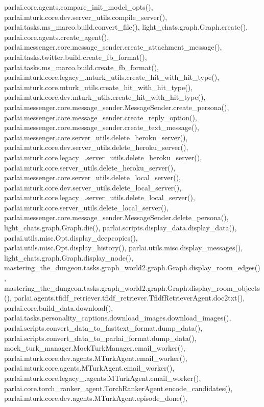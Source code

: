 parlai.\+core.\+agents.\+compare\+\_\+init\+\_\+model\+\_\+opts(), parlai.\+mturk.\+core.\+dev.\+server\+\_\+utils.\+compile\+\_\+server(), parlai.\+tasks.\+ms\+\_\+marco.\+build.\+convert\+\_\+file(), light\+\_\+chats.\+graph.\+Graph.\+create(), parlai.\+core.\+agents.\+create\+\_\+agent(), parlai.\+messenger.\+core.\+message\+\_\+sender.\+create\+\_\+attachment\+\_\+message(), parlai.\+tasks.\+twitter.\+build.\+create\+\_\+fb\+\_\+format(), parlai.\+tasks.\+ms\+\_\+marco.\+build.\+create\+\_\+fb\+\_\+format(), parlai.\+mturk.\+core.\+legacy\+\_.\+mturk\+\_\+utils.\+create\+\_\+hit\+\_\+with\+\_\+hit\+\_\+type(), parlai.\+mturk.\+core.\+mturk\+\_\+utils.\+create\+\_\+hit\+\_\+with\+\_\+hit\+\_\+type(), parlai.\+mturk.\+core.\+dev.\+mturk\+\_\+utils.\+create\+\_\+hit\+\_\+with\+\_\+hit\+\_\+type(), parlai.\+messenger.\+core.\+message\+\_\+sender.\+Message\+Sender.\+create\+\_\+persona(), parlai.\+messenger.\+core.\+message\+\_\+sender.\+create\+\_\+reply\+\_\+option(), parlai.\+messenger.\+core.\+message\+\_\+sender.\+create\+\_\+text\+\_\+message(), parlai.\+messenger.\+core.\+server\+\_\+utils.\+delete\+\_\+heroku\+\_\+server(), parlai.\+mturk.\+core.\+dev.\+server\+\_\+utils.\+delete\+\_\+heroku\+\_\+server(), parlai.\+mturk.\+core.\+legacy\+\_.\+server\+\_\+utils.\+delete\+\_\+heroku\+\_\+server(), parlai.\+mturk.\+core.\+server\+\_\+utils.\+delete\+\_\+heroku\+\_\+server(), parlai.\+messenger.\+core.\+server\+\_\+utils.\+delete\+\_\+local\+\_\+server(), parlai.\+mturk.\+core.\+dev.\+server\+\_\+utils.\+delete\+\_\+local\+\_\+server(), parlai.\+mturk.\+core.\+legacy\+\_.\+server\+\_\+utils.\+delete\+\_\+local\+\_\+server(), parlai.\+mturk.\+core.\+server\+\_\+utils.\+delete\+\_\+local\+\_\+server(), parlai.\+messenger.\+core.\+message\+\_\+sender.\+Message\+Sender.\+delete\+\_\+persona(), light\+\_\+chats.\+graph.\+Graph.\+die(), parlai.\+scripts.\+display\+\_\+data.\+display\+\_\+data(), parlai.\+utils.\+misc.\+Opt.\+display\+\_\+deepcopies(), parlai.\+utils.\+misc.\+Opt.\+display\+\_\+history(), parlai.\+utils.\+misc.\+display\+\_\+messages(), light\+\_\+chats.\+graph.\+Graph.\+display\+\_\+node(), mastering\+\_\+the\+\_\+dungeon.\+tasks.\+graph\+\_\+world2.\+graph.\+Graph.\+display\+\_\+room\+\_\+edges(), mastering\+\_\+the\+\_\+dungeon.\+tasks.\+graph\+\_\+world2.\+graph.\+Graph.\+display\+\_\+room\+\_\+objects(), parlai.\+agents.\+tfidf\+\_\+retriever.\+tfidf\+\_\+retriever.\+Tfidf\+Retriever\+Agent.\+doc2txt(), parlai.\+core.\+build\+\_\+data.\+download(), parlai.\+tasks.\+personality\+\_\+captions.\+download\+\_\+images.\+download\+\_\+images(), parlai.\+scripts.\+convert\+\_\+data\+\_\+to\+\_\+fasttext\+\_\+format.\+dump\+\_\+data(), parlai.\+scripts.\+convert\+\_\+data\+\_\+to\+\_\+parlai\+\_\+format.\+dump\+\_\+data(), mock\+\_\+turk\+\_\+manager.\+Mock\+Turk\+Manager.\+email\+\_\+worker(), parlai.\+mturk.\+core.\+dev.\+agents.\+M\+Turk\+Agent.\+email\+\_\+worker(), parlai.\+mturk.\+core.\+agents.\+M\+Turk\+Agent.\+email\+\_\+worker(), parlai.\+mturk.\+core.\+legacy\+\_.\+agents.\+M\+Turk\+Agent.\+email\+\_\+worker(), parlai.\+core.\+torch\+\_\+ranker\+\_\+agent.\+Torch\+Ranker\+Agent.\+encode\+\_\+candidates(), parlai.\+mturk.\+core.\+dev.\+agents.\+M\+Turk\+Agent.\+episode\+\_\+done(), 